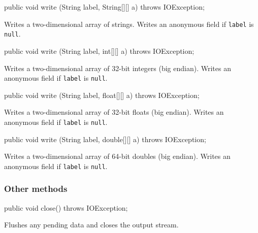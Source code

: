 \begin{code}

   public void write (String label, String[][] a) throws IOException;
\end{code}
\begin{tabb}
Writes a two-dimensional array of strings.
Writes an anonymous field if \texttt{label} is \texttt{null}.
\end{tabb}

\begin{code}

   public void write (String label, int[][] a) throws IOException;
\end{code}
\begin{tabb}
Writes a two-dimensional array of 32-bit integers (big endian).
Writes an anonymous field if \texttt{label} is \texttt{null}.
\end{tabb}

\begin{code}

   public void write (String label, float[][] a) throws IOException;
\end{code}
\begin{tabb}
Writes a two-dimensional array of 32-bit floats (big endian).
Writes an anonymous field if \texttt{label} is \texttt{null}.
\end{tabb}

\begin{code}

   public void write (String label, double[][] a) throws IOException;
\end{code}
\begin{tabb}
Writes a two-dimensional array of 64-bit doubles (big endian).
Writes an anonymous field if \texttt{label} is \texttt{null}.
\end{tabb}


\subsubsection*{Other methods}

\begin{code}

   public void close() throws IOException;
\end{code}
\begin{tabb}
    Flushes any pending data and closes the output stream.
\end{tabb}

\begin{code}\begin{hide}
}
\end{hide}\end{code}
